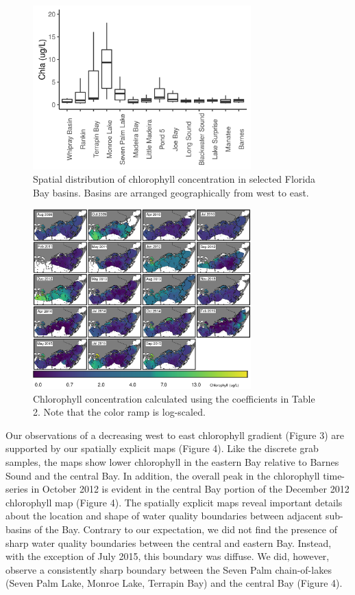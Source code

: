 \begin{figure}
  \centering
  \includegraphics[width=0.75\textwidth]{../../figures/chlboxplot.png}
  \caption{Spatial distribution of chlorophyll concentration in selected Florida Bay basins. Basins are arranged geographically from west to east.}
  \label{fig:3}
\end{figure}

\begin{figure}
  \centering
  \includegraphics[width=0.75\textwidth]{../../figures/multipanel.png}
  \caption{Chlorophyll concentration calculated using the coefficients in Table 2. Note that the color ramp is log-scaled.}
  \label{fig:4}
\end{figure}

Our observations of a decreasing west to east chlorophyll gradient (Figure 3) are supported by our spatially explicit maps (Figure 4). Like the discrete grab samples, the maps show lower chlorophyll in the eastern Bay relative to Barnes Sound and the central Bay. In addition, the overall peak in the chlorophyll time-series in October 2012 is evident in the central Bay portion of the December 2012 chlorophyll map (Figure 4). The spatially explicit maps reveal important details about the location and shape of water quality boundaries between adjacent sub-basins of the Bay. Contrary to our expectation, we did not find the presence of sharp water quality boundaries between the central and eastern Bay. Instead, with the exception of July 2015, this boundary was diffuse. We did, however, observe a consistently sharp boundary between the Seven Palm chain-of-lakes (Seven Palm Lake, Monroe Lake, Terrapin Bay) and the central Bay (Figure 4). 

